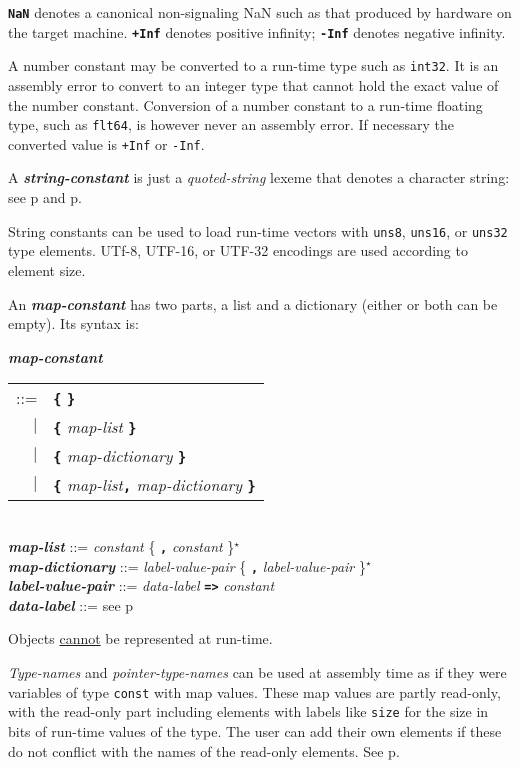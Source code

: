 \documentclass[12pt]{article}
\newcommand{\TT}[1]{{\tt \bfseries #1}}
\newcommand{\STAR}{{\Large $^\star$}}
\newcommand{\emkey}[1]{{\em \bfseries #1}}
\newcommand{\pagref}[1]{p\pageref{#1}}
\newenvironment{indpar}[1][0.3in]%
	{\begin{list}{}%
		     {\setlength{\itemsep}{0in}%
		      \setlength{\topsep}{0in}%
		      \setlength{\parsep}{1ex}%
		      \setlength{\labelwidth}{#1}%
		      \setlength{\leftmargin}{#1}%
		      \addtolength{\leftmargin}{\labelsep}}%
	 \item}%
	{\end{list}}
\begin{document}
\TT{NaN} denotes a canonical non-signaling NaN such
as that produced by hardware on the target machine.
\TT{+Inf} denotes positive infinity; \TT{-Inf} denotes negative infinity.

A number constant may be converted to a run-time type such as {\tt int32}.
It is an assembly error to convert to an integer type that cannot
hold the exact value of the number constant.
Conversion of a number constant
to a run-time floating type, such as {\tt flt64}, is however
never an assembly error.  If necessary the converted value is
{\tt +Inf} or {\tt -Inf}.

A \emkey{string-constant} is just a {\em quoted-string} lexeme
that denotes a character string: see
\pagref{QUOTED-STRING} and \pagref{QUOTED-STRING-CONCATENATION}.

String constants can be used to load run-time vectors
with {\tt uns8}, {\tt uns16}, or {\tt uns32} type elements.
UTf-8, UTF-16, or UTF-32 encodings are used according to element
size.

An \emkey{map-constant} has two parts, a list and a dictionary
(either or both can be empty).  Its syntax is:

\begin{indpar}
\emkey{map-constant}
    \begin{tabular}[t]{rl}
    ::= & \TT{\{} \TT{\}} \\
    $|$ & \TT{\{} {\em map-list} \TT{\}} \\
    $|$ & \TT{\{} {\em map-dictionary} \TT{\}} \\
    $|$ & \TT{\{} {\em map-list}\TT{,} {\em map-dictionary} \TT{\}} \\
    \end{tabular}
\\[0.5ex]
\emkey{map-list} ::= {\em constant} \{ \TT{,} {\em constant} \}\STAR{}
\\[0.5ex]
\emkey{map-dictionary} ::= {\em label-value-pair}
                              \{ \TT{,} {\em label-value-pair} \}\STAR{}
\\[0.5ex]
\emkey{label-value-pair} ::= {\em data-label} \TT{=>} {\em constant}
\\[0.5ex]
\emkey{data-label} ::= see \pagref{DATA-LABEL}
\end{indpar}

Objects \underline{cannot} be represented at run-time.

{\em Type-names} and {\em pointer-type-names} can be used at
assembly time as if they were variables of type {\tt const}
with map values.  These map values are partly read-only,
with the read-only part including elements with labels like
{\tt size} for the size in bits of run-time values of the type.
The user can add their own elements if these do not conflict
with the names of the read-only elements.  See \pagref{TYPE-MAPS}.
\end{document}

